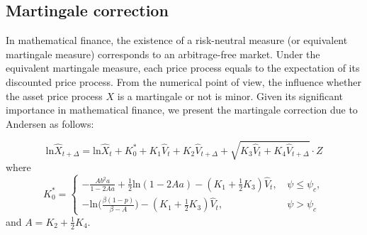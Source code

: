 \documentclass{ws-ijfe}
\begin{document}

\subsection{Martingale correction}\label{se:mtg correction}

In mathematical finance, the existence of a risk-neutral measure (or equivalent martingale measure) corresponds to an arbitrage-free market. Under the equivalent martingale measure, each price process equals to the expectation of its discounted price process.
From the numerical point of view, the influence whether the asset price process $X$ is a martingale or not is minor. Given its significant importance in mathematical finance, we present the martingale correction due to Andersen \cite{Andersen2006} as follows:

\begin{equation*}
  \text{ln}\hat{X}_{t+\Delta}=\text{ln}\hat{X}_t+K_0^*+K_1\hat{V}_t+K_2\hat{V}_{t+\Delta}+\sqrt{K_3\hat{V}_t+K_4\hat{V}_{t+\Delta}}\cdot Z
\end{equation*}
where
\[
  K_0^*=
  \begin{cases}
    -\frac{Ab^2a}{1-2Aa}+\frac{1}{2}\text{ln}(1-2Aa)-(K_1+\frac{1}{2}{K_3}){\hat{V}_t},\,&\psi\leq\psi_c,\\
    -\text{ln}\bigg(\frac{\beta(1-p)}{\beta-A}\bigg)-(K_1+\frac{1}{2}{K_3}){\hat{V}_t},&\psi>\psi_c
  \end{cases}
  \]
and $A=K_2+\frac{1}{2}K_4$.
\end{document}
